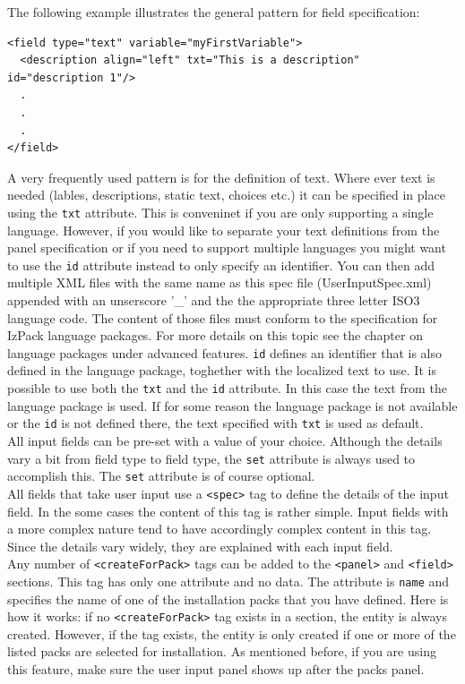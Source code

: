 The following example illustrates the general pattern for field specification:\\

\footnotesize
\begin{verbatim}
<field type="text" variable="myFirstVariable">
  <description align="left" txt="This is a description" id="description 1"/>
  .
  .
  .
</field>
\end{verbatim}
\normalsize

A very frequently used pattern is for the definition of text. Where ever
text is needed (lables, descriptions, static text, choices etc.) it can
be specified in place using the \texttt{txt} attribute. This is
conveninet if you are only supporting a single language. However, if you
would like to separate your text definitions from the panel
specification or if you need to support multiple languages you might
want to use the \texttt{id} attribute instead to only specify an
identifier. You can then add multiple XML files with the same name as
this spec file (UserInputSpec.xml) appended with an unserscore '_' and
the the appropriate three letter ISO3 language code. The content of
those files must conform to the specification for IzPack language
packages. For more details on this topic see the chapter on language
packages under advanced features. \texttt{id} defines an identifier that
is also defined in the language package, toghether with the localized
text to use. It is possible to use both the \texttt{txt} and the
\texttt{id} attribute. In this case the text from the language package
is used. If for some reason the language package is not available or the
\texttt{id} is not defined there, the text specified with \texttt{txt}
is used as default.\\

All input fields can be pre-set with a value of your choice. Although
the details vary a bit from field type to field type, the \texttt{set}
attribute is always used to accomplish this. The \texttt{set} attribute
is of course optional.\\

All fields that take user input use a \texttt{<spec>} tag to define the
details of the input field. In the some cases the content of this tag is
rather simple. Input fields with a more complex nature tend to have
accordingly complex content in this tag. Since the details vary widely,
they are explained with each input field.\\

Any number of \texttt{<createForPack>} tags can be added to the
\texttt{<panel>} and \texttt{<field>} sections. This tag has only one
attribute and no data. The attribute is \texttt{name} and specifies the
name of one of the installation packs that you have defined. Here is how
it works: if no \texttt{<createForPack>} tag exists in a section, the
entity is always created. However, if the tag exists, the entity is only
created if one or more of the listed packs are selected for
installation. As mentioned before, if you are using this feature, make
sure the user input panel shows up after the packs panel.\\

